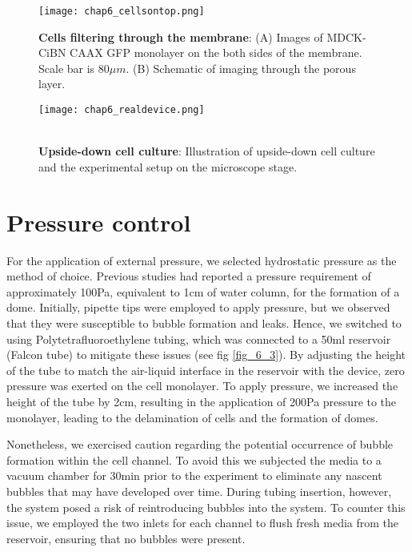 \begin{figure}[]
	\centering
	\texttt{[image: chap6\_cellsontop.png]}
	\caption{ \textbf{Cells filtering through the membrane}: (A) Images of MDCK-CiBN CAAX GFP monolayer on the both sides of the membrane. Scale bar is $80\mu m$. (B) Schematic of imaging through the porous layer.	}\label{fig_6_4}
\end{figure}

\begin{figure}[]
	\begin{minipage}[c]{0.7\textwidth}
		\texttt{[image: chap6\_realdevice.png]}
	\end{minipage}\hfill
	\begin{minipage}[c]{0.27\textwidth}
		\caption{\\ \textbf{Upside-down cell culture}: Illustration of upside-down cell culture and the experimental setup on the microscope stage.
		}\label{fig_6_5}
	\end{minipage}
\end{figure}

\hypertarget{pressure-control}{%
\section{Pressure control}\label{pressure-control}}

For the application of external pressure, we selected hydrostatic pressure as the method of choice. Previous studies had reported a pressure requirement of approximately 100\unit{\pascal}, equivalent to 1\unit{\cm} of water column, for the formation of a dome. Initially, pipette tips were employed to apply pressure, but we observed that they were susceptible to bubble formation and leaks. Hence, we switched to using Polytetrafluoroethylene tubing, which was connected to a 50\unit{\ml} reservoir (Falcon tube) to mitigate these issues (see fig \ref{fig_6_3}). By adjusting the height of the tube to match the air-liquid interface in the reservoir with the device, zero pressure was exerted on the cell monolayer. To apply pressure, we increased the height of the tube by 2\unit{\cm}, resulting in the application of 200\unit{\pascal} pressure to the monolayer, leading to the delamination of cells and the formation of domes.

Nonetheless, we exercised caution regarding the potential occurrence of bubble formation within the cell channel. To avoid this we subjected the media to a vacuum chamber for 30\unit{\minute} prior to the experiment to eliminate any nascent bubbles that may have developed over time. During tubing insertion, however, the system posed a risk of reintroducing bubbles into the system. To counter this issue, we employed the two inlets for each channel to flush fresh media from the reservoir, ensuring that no bubbles were present.

